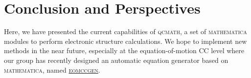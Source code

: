 \documentclass[aip,jcp,reprint,noshowkeys,superscriptaddress]{revtex4-1}
\newcommand{\qcmath}{\textsc{qcmath}\xspace}
\newcommand{\mathematica}{\textsc{mathematica}\xspace}
\begin{document}
\section{Conclusion and Perspectives}
Here, we have presented the current capabilities of \qcmath, a set of \mathematica modules to perform electronic structure calculations.
We hope to implement new methods in the near future, especially at the equation-of-motion CC level where our group has recently designed an automatic equation generator based on \mathematica, named \href{https://github.com/rquintero-88/eomccgen}{\textsc{eomccgen}}. \cite{eomccgen}



\end{document}
